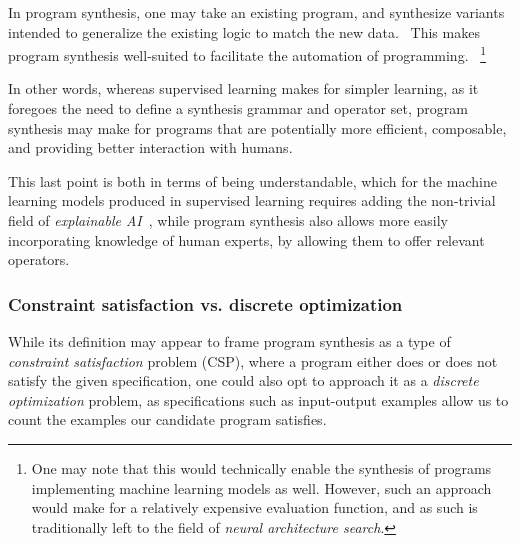 \documentclass{article}
\begin{document}
In program synthesis, one may take an existing program, and synthesize variants intended to generalize the existing logic to match the new data.~\citep{myth}
This makes program synthesis well-suited to facilitate the automation of programming.%
~\footnote{
    One may note that this would technically enable the synthesis of programs implementing machine learning models as well.
    However, such an approach would make for a relatively expensive evaluation function,
    and as such is traditionally left to the field of \emph{neural architecture search}.
}

In other words, whereas supervised learning makes for simpler learning,
as it foregoes the need to define a synthesis grammar and operator set,
program synthesis may make for programs that are potentially more efficient,
composable,
and providing better interaction with humans.

This last point is both in terms of being understandable,
which for the machine learning models produced in supervised learning requires adding the non-trivial field of \emph{explainable AI}~\citep{gunning2017explainable},
while program synthesis also allows more easily incorporating knowledge of human experts,
by allowing them to offer relevant operators.

\subsubsection{Constraint satisfaction vs. discrete optimization}

While its definition may appear to frame program synthesis as a type of \emph{constraint satisfaction} problem (CSP),
where a program either does or does not satisfy the given specification,
one could also opt to approach it as a \emph{discrete optimization} problem,
as specifications such as input-output examples allow us to count the examples our candidate program satisfies.
\end{document}
